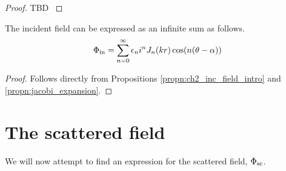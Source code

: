     \begin{proof} TBD \parencite[$\S$2.5]{martin06scattering}
    \end{proof}
%
    \begin{propn}\label{propn:ch2_inc_field_infty_sum}
    The incident field can be expressed as an infinite sum as follows.
        \begin{equation*}\label{eq:ch2_inc_field_infty_sum}
            \Phi_{\text{in}} = \sum^{\infty}_{n=0} \epsilon_n i^n J_n(kr) \cos (n(\theta - \alpha))
        \end{equation*}
    \end{propn}
    \begin{proof}
    Follows directly from Propositions \ref{propn:ch2_inc_field_intro} and  \ref{propn:jacobi_expansion}.
    \end{proof}
\section{The scattered field}\label{ss:scattered_field}
We will now attempt to find an expression for the scattered field, $\Phi_{\text{sc}}$.
